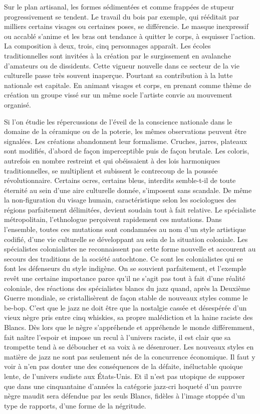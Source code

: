 \documentclass[french,twoside]{book} %
\begin{document}
\noindent Sur le plan artisanal, les formes sédimentées et comme frappées de stupeur progressivement se tendent. Le travail du bois par exemple, qui rééditait par milliers certains visages ou certaines poses, se différencie. Le masque inexpressif ou accablé s’anime et les bras ont tendance à quitter le corps, à esquisser l’action. La composition à deux, trois, cinq personnages apparaît. Les écoles traditionnelles sont invitées à la création par le surgissement en avalanche d’amateurs ou de dissidents. Cette vigueur nouvelle dans ce secteur de la vie culturelle passe très souvent inaperçue. Pourtant sa contribution à la lutte nationale est capitale. En animant visages et corps, en prenant comme thème de création un groupe vissé sur un même socle l’artiste convie au mouvement organisé.\par
\bigbreak
\noindent Si l’on étudie les répercussions de l’éveil de la conscience nationale dans le domaine de la céramique ou de la poterie, les mêmes observations peuvent être signalées. Les créations abandonnent leur formalisme. Cruches, jarres, plateaux sont modifiés, d’abord de façon imperceptible puis de façon brutale. Les coloris, autrefois en nombre restreint et qui obéissaient à des lois harmoniques traditionnelles, se multiplient et subissent le contrecoup de la poussée révolutionnaire. Certains ocres, certains bleus, interdits semble-t-il de toute éternité au sein d’une aire culturelle donnée, s’imposent sans scandale. De même la non-figuration du visage humain, caractéristique selon les sociologues des régions parfaitement délimitées, devient soudain tout à fait relative. Le spécialiste métropolitain, l’ethnologue perçoivent rapidement ces mutations. Dans l’ensemble, toutes ces mutations sont condamnées au nom d’un style artistique codifié, d’une vie culturelle se développant au sein de la situation coloniale. Les spécialistes colonialistes ne   reconnaissent pas cette forme nouvelle et accourent au secours des traditions de la société autochtone. Ce sont les colonialistes qui se font les défenseurs du style indigène. On se souvient parfaitement, et l’exemple revêt une certaine importance parce qu’il ne s’agit pas tout à fait d’une réalité coloniale, des réactions des spécialistes blancs du jazz quand, après la Deuxième Guerre mondiale, se cristallisèrent de façon stable de nouveaux styles comme le be-bop. C’est que le jazz ne doit être que la nostalgie cassée et désespérée d’un vieux nègre pris entre cinq whiskies, sa propre malédiction et la haine raciste des Blancs. Dès lors que le nègre s’appréhende et appréhende le monde différemment, fait naître l’espoir et impose un recul à l’univers raciste, il est clair que sa trompette tend à se déboucher et sa voix à se désenrouer. Les nouveaux styles en matière de jazz ne sont pas seulement nés de la concurrence économique. Il faut y voir à n’en pas douter une des conséquences de la défaite, inéluctable quoique lente, de l’univers sudiste aux États-Unis. Et il n’est pas utopique de supposer que dans une cinquantaine d’années la catégorie jazz-cri hoqueté d’un pauvre nègre maudit sera défendue par les seuls Blancs, fidèles à l’image stoppée d’un type de rapports, d’une forme de la négritude.\par
\end{document}
